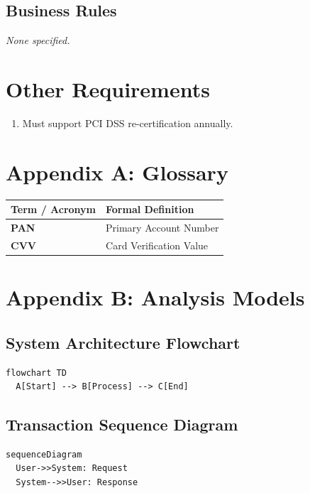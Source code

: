 \documentclass[11pt,a4paper]{article}
\begin{document}
\subsection{Business Rules}
\textit{None specified.}\par\vspace{6pt}
\section{Other Requirements}
\begin{enumerate}[leftmargin=*]
    \item Must support PCI DSS re-certification annually.
\end{enumerate}

\section{Appendix A: Glossary}
\begin{table}[h!]
\centering
\begin{tabularx}{\linewidth}{l X}
\toprule
\textbf{Term / Acronym} & \textbf{Formal Definition} \\
\midrule
\textbf{PAN} & Primary Account Number \\
\textbf{CVV} & Card Verification Value \\
\bottomrule
\end{tabularx}
\end{table}

\section{Appendix B: Analysis Models}
\subsection{System Architecture Flowchart}
\begin{lstlisting}[language={},caption={Flowchart Model (Mermaid Source)}]
flowchart TD
  A[Start] --> B[Process] --> C[End]
\end{lstlisting}

\subsection{Transaction Sequence Diagram}
\begin{lstlisting}[language={},caption={Sequence Model (Mermaid Source)}]
sequenceDiagram
  User->>System: Request
  System-->>User: Response
\end{lstlisting}
\end{document}
